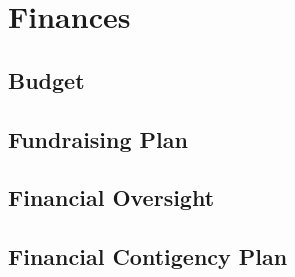 \section{Finances}
\subsection{Budget}

\subsection{Fundraising Plan}


\subsection{Financial Oversight}

\subsection{Financial Contigency Plan}
